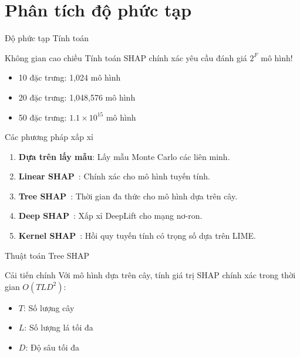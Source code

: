 \documentclass[notheorems, aspectratio=149]{beamer}
\begin{document}
\section{Phân tích độ phức tạp}

\begin{frame}{Độ phức tạp Tính toán}
\begin{alertblock}{Không gian cao chiều}
Tính toán SHAP chính xác yêu cầu đánh giá $2^F$ mô hình!
\begin{itemize}
    \item 10 đặc trưng: 1,024 mô hình
    \item 20 đặc trưng: 1,048,576 mô hình
    \item 50 đặc trưng: $1.1 \times 10^{15}$ mô hình
\end{itemize}
\end{alertblock}

\begin{block}{Các phương pháp xấp xỉ}
\begin{enumerate}
    \item \textbf{Dựa trên lấy mẫu}: Lấy mẫu Monte Carlo các liên minh.
    \item \textbf{Linear SHAP}~\cite{lundberg2020local}: Chính xác cho mô hình tuyến tính.
    \item \textbf{Tree SHAP}~\cite{lundberg2018consistent,shrikumar2017learning}: Thời gian đa thức cho mô hình dựa trên cây.
    \item \textbf{Deep SHAP}~\cite{lundberg2018deep,ribeiro2016should}: Xấp xỉ DeepLift cho mạng nơ-ron.
    \item \textbf{Kernel SHAP}~\cite{sundararajan2020many}: Hồi quy tuyến tính có trọng số dựa trên LIME.
\end{enumerate}
\end{block}
\end{frame}

\begin{frame}{Thuật toán Tree SHAP}
\begin{block}{Cải tiến chính}
Với mô hình dựa trên cây, tính giá trị SHAP chính xác trong thời gian $O(TLD^2)$:
\begin{itemize}
    \item $T$: Số lượng cây
    \item $L$: Số lượng lá tối đa
    \item $D$: Độ sâu tối đa
\end{itemize}
\end{block}
\end{frame}
\end{document}
